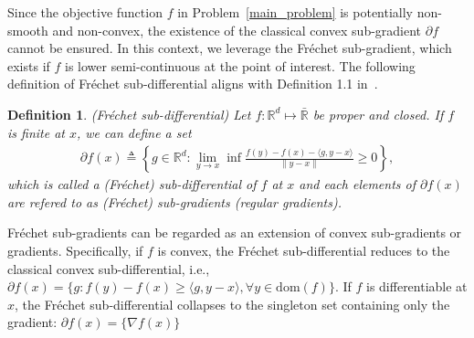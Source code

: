 \documentclass{article}
\newtheorem{definition}{Definition}
\def \dom {\text{dom}}
\def \R {\mathbb{R}}
\begin{document}
Since the objective function \( f \)  in Problem~\eqref{main_problem} is potentially non-smooth and non-convex, the existence of the classical convex sub-gradient \( \partial f \) cannot be ensured. In this context, we leverage the Fréchet sub-gradient, which exists if \( f \) is lower semi-continuous at the point of interest. The following definition of Fréchet sub-differential aligns with Definition 1.1 in~\citep{Kruger_Alex_2003}.
\begin{definition}{(Fréchet sub-differential)}
Let $f:\R^d\mapsto\bar{\R}$ be proper and closed. If $f$ is finite at $x$, we can define a set
\begin{align*}
    \partial f(x) \triangleq \left\{g\in\R^d:\lim_{y\rightarrow x}\inf\frac{f(y)-f(x)-\langle g,y-x\rangle}{\|y-x\|}\geq 0\right\},
\end{align*}
which is called a (Fréchet) sub-differential of $f$ at $x$ and each elements of $\partial f(x)$ are refered to as (Fréchet) sub-gradients (regular gradients). 
\end{definition}
Fréchet sub-gradients can be regarded as an extension of convex sub-gradients or gradients. Specifically, if 
$f$ is convex, the Fréchet sub-differential reduces to the classical convex sub-differential, i.e., $\partial f(x) = \{g:f(y)-f(x) \geq \langle g, y-x\rangle, \forall y\in\dom(f)\}$. If $f$ is differentiable at $x$, the Fréchet sub-differential collapses to the singleton set containing only the gradient: $\partial f(x) = \{\nabla f(x)\}$
\end{document}
